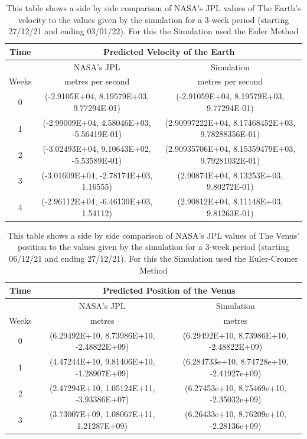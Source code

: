 \documentclass[a4paper,10pt]{article}
\begin{document}
\begin{table}[htp!]
\begin{center}
\begin{tabular}{|c|c|c|}
\hline 
Time & \multicolumn{2}{|c|}{Predicted Velocity of the Earth} \\
\hline
  & NASA's JPL & Simulation \\
Weeks & metres per second & metres per second\\
\hline
   0 & (-2.9105E+04, 8.19579E+03, 9.77294E-01) & (-2.91059E+04, 8.19579E+03, 9.77294E-01) \\ 
   1 & (-2.99009E+04, 4.58046E+03, -5.56419E-01) & (2.90997222E+04, 8.17468452E+03, 9.78288356E-01)  \\
   2 & (-3.02493E+04, 9.10643E+02, -5.53589E-01) & (2.90935706E+04, 8.15359479E+03, 9.79281032E-01) \\
   3 & (-3.01609E+04, -2.78174E+03, 1.16555) & (2.90874E+04, 8.13253E+03, 9.80272E-01) \\
   4 & (-2.96112E+04, -6.46139E+03, 1.54112) & (2.90812E+04, 8.11148E+03, 9.81263E-01)\\
   
\hline 
\end{tabular}
\end{center}
\caption{\label{table:Magnitude of Conserved Quantities} This table shows a side by side comparison of NASA's JPL values of The Earth's velocity to the values given by the simulation for a 3-week period (starting 27/12/21 and ending 03/01/22). For this the Simulation used the Euler Method}
\end{table}
\begin{table}[h]
\begin{center}
\begin{tabular}{|c|c|c|}
\hline 
Time & \multicolumn{2}{|c|}{Predicted Position of the Venus}  \\
\hline
  & NASA's JPL & Simulation\\
Weeks & metres & metres \\
\hline
   0 & (6.29492E+10, 8.73986E+10, -2.48822E+09) & (6.29492E+10, 8.73986E+10, -2.48822E+09)  \\ 
   1 & (4.47244E+10, 9.81406E+10, -1.28907E+09) & (6.284733e+10,  8.74728e+10, -2.41927e+09)\\
   2 & (2.47294E+10, 1.05124E+11, -3.93386E+07) & (6.27453e+10,  8.75469e+10, -2.35032e+09)\\
   3 & (3.73007E+09, 1.08067E+11, 1.21287E+09) & (6.26433e+10,  8.76209e+10, -2.28136e+09)   \\
   
\hline 
\end{tabular}
\end{center}
\caption{\label{table:Magnitude of Conserved Quantities} This table shows a side by side comparison of NASA's JPL values of The Venus' position to the values given by the simulation for a 3-week period (starting 06/12/21 and ending 27/12/21). For this the Simulation used the Euler-Cromer Method}
\end{table}
\end{document}
